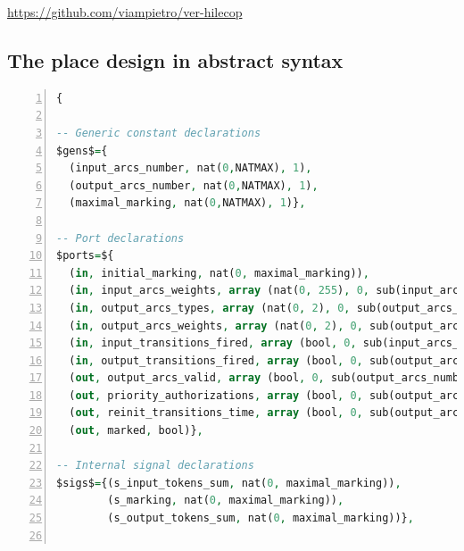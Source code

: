 \documentclass[pdflatex,sn-mathphys]{sn-jnl}%
\theoremstyle{thmstyleone}%
\theoremstyle{thmstyletwo}%
\theoremstyle{thmstylethree}%
\begin{document}
\begin{center}
  \url{https://github.com/viampietro/ver-hilecop}
\end{center}

% 
% 
% 
% 
% 
% 

\clearpage
\begin{appendices}

\section{The place design in abstract \hvhdl{} syntax}
\label{app:place-design}

\begin{lstlisting}[language=VHDL,
  label={lst:place-design-abss},
  caption={The \texttt{place} design in \hvhdl{} abstract syntax.},
  basicstyle=\fontsize{8}{10}\selectfont,
  framexleftmargin=1.5em,
  xleftmargin=2em,
  numbers=left,
  numberstyle=\tiny\ttfamily]
{
    
-- Generic constant declarations
$gens$={
  (input_arcs_number, nat(0,NATMAX), 1), 
  (output_arcs_number, nat(0,NATMAX), 1),
  (maximal_marking, nat(0,NATMAX), 1)},

-- Port declarations
$ports=${
  (in, initial_marking, nat(0, maximal_marking)),
  (in, input_arcs_weights, array (nat(0, 255), 0, sub(input_arcs_number, 1))),
  (in, output_arcs_types, array (nat(0, 2), 0, sub(output_arcs_number, 1))),
  (in, output_arcs_weights, array (nat(0, 2), 0, sub(output_arcs_number, 1))),
  (in, input_transitions_fired, array (bool, 0, sub(input_arcs_number, 1))),          
  (in, output_transitions_fired, array (bool, 0, sub(output_arcs_number, 1))),
  (out, output_arcs_valid, array (bool, 0, sub(output_arcs_number, 1))),
  (out, priority_authorizations, array (bool, 0, sub(output_arcs_number, 1))),
  (out, reinit_transitions_time, array (bool, 0, sub(output_arcs_number, 1))),
  (out, marked, bool)},
  
-- Internal signal declarations
$sigs$={(s_input_tokens_sum, nat(0, maximal_marking)),
        (s_marking, nat(0, maximal_marking)),
        (s_output_tokens_sum, nat(0, maximal_marking))},
       

\end{lstlisting}
\end{appendices}
\end{document}
